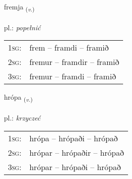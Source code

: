 \documentclass[frontgrid, backgrid]{flacards}\usepackage[]{graphicx}\usepackage[]{xcolor}
\begin{document}
\renewcommand{\flhead}{\vskip5pt \fboxsep=0pt {\small\bfseries\footnotesize Sagnorð | czasownik}}
\renewcommand{\fcfoot}{\vskip5pt \fboxsep=0pt \hspace{2pt}{\small\bfseries\footnotesize 3K}}

\renewcommand{\blhead}{\vskip5pt {\small\bfseries\footnotesize Sagnorð | czasownik }}
\renewcommand{\bcfoot}{\vskip5pt \hspace{2pt}{\small\bfseries\footnotesize 3K}}


{fremja \small{\textsubscript{(\textit{v.})}} \\[1ex] %
\textphonetic{[frɛmja]} \\
pl.: \emph{popełnić} \\  [2ex]
\renewcommand*{\arraystretch}{0.8}
\begin{tabular}{p{1cm}l}
\textsc{1sg}: & frem -- framdi -- framið \\ 
\textsc{2sg}: & fremur -- framdir -- framið \\ 
\textsc{3sg}: & fremur -- framdi -- framið \\ 
\end{tabular}
}

\renewcommand{\flhead}{\vskip5pt \fboxsep=0pt {\small\bfseries\footnotesize Sagnorð | czasownik}}
\renewcommand{\fcfoot}{\vskip5pt \fboxsep=0pt \hspace{2pt}{\small\bfseries\footnotesize 3K}}

\renewcommand{\blhead}{\vskip5pt {\small\bfseries\footnotesize Sagnorð | czasownik }}
\renewcommand{\bcfoot}{\vskip5pt \hspace{2pt}{\small\bfseries\footnotesize 3K}}


{hrópa \small{\textsubscript{(\textit{v.})}} \\[1ex] %
\textphonetic{[r̥ouːpa]} \\
pl.: \emph{krzyczeć} \\  [2ex]
\renewcommand*{\arraystretch}{0.8}
\begin{tabular}{p{1cm}l}
\textsc{1sg}: & hrópa -- hrópaði -- hrópað \\ 
\textsc{2sg}: & hrópar -- hrópaðir -- hrópað \\ 
\textsc{3sg}: & hrópar -- hrópaði -- hrópað \\ 
\end{tabular}
}
\end{document}
